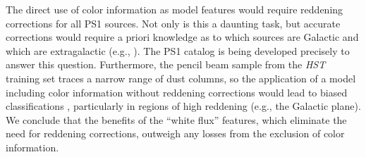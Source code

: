 \documentclass[twocolumn]{aastex62}
\begin{document}
\begin{CJK*}{UTF8}{gbsn}
The direct use of color information as model features would require
reddening corrections for all PS1 sources. Not only is this a daunting task,
but accurate corrections would require a priori knowledge as to which
sources are Galactic and which are extragalactic (e.g., \citealt{Green15}).
The PS1 catalog is being developed precisely to answer this question.
Furthermore, the pencil beam sample from the \textit{HST} training set
traces a narrow range of dust columns, so the application of a model
including color information without reddening corrections would lead to
biased classifications \citep{Sevilla18}, particularly in regions of high
reddening (e.g., the Galactic plane). We conclude that the benefits of the
``white flux'' features, which eliminate the need for reddening corrections,
outweigh any losses from the exclusion of color information.


\end{CJK*}
\end{document}
